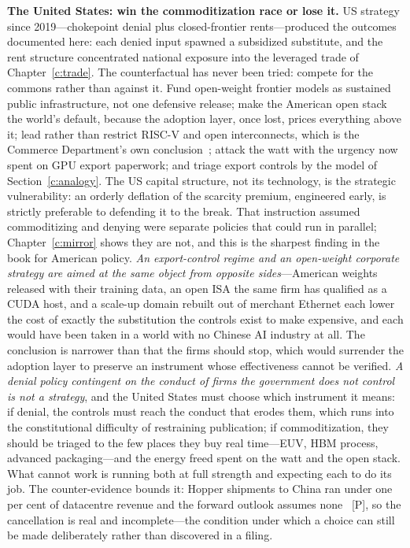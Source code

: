 \textbf{The United States: win the commoditization race or lose it.}  US strategy since 2019---chokepoint denial plus closed-frontier rents---produced the outcomes documented here: each denied input spawned a subsidized substitute, and the rent structure concentrated national exposure into the leveraged trade of Chapter~\ref{c:trade}. The counterfactual has never been tried: compete for the commons rather than against it. Fund open-weight frontier models as sustained public infrastructure, not one defensive release; make the American open stack the world's default, because the adoption layer, once lost, prices everything above it; lead rather than restrict RISC-V and open interconnects, which is the Commerce Department's own conclusion~\cite{riscv-restrict}; attack the watt with the urgency now spent on GPU export paperwork; and triage export controls by the model of Section~\ref{c:analogy}. The US capital structure, not its technology, is the strategic vulnerability: an orderly deflation of the scarcity premium, engineered early, is strictly preferable to defending it to the break. That instruction assumed commoditizing and denying were separate policies that could run in parallel; Chapter~\ref{c:mirror} shows they are not, and this is the sharpest finding in the book for American policy. \emph{An export-control regime and an open-weight corporate strategy are aimed at the same object from opposite sides}---American weights released with their training data, an open ISA the same firm has qualified as a CUDA host, and a scale-up domain rebuilt out of merchant Ethernet each lower the cost of exactly the substitution the controls exist to make expensive, and each would have been taken in a world with no Chinese AI industry at all. The conclusion is narrower than that the firms should stop, which would surrender the adoption layer to preserve an instrument whose effectiveness cannot be verified. \emph{A denial policy contingent on the conduct of firms the government does not control is not a strategy}, and the United States must choose which instrument it means: if denial, the controls must reach the conduct that erodes them, which runs into the constitutional difficulty of restraining publication; if commoditization, they should be triaged to the few places they buy real time---EUV, HBM process, advanced packaging---and the energy freed spent on the watt and the open stack. What cannot work is running both at full strength and expecting each to do its job. The counter-evidence bounds it: Hopper shipments to China ran under one per cent of datacentre revenue and the forward outlook assumes none~\cite{nvda-segments} [P], so the cancellation is real and incomplete---the condition under which a choice can still be made deliberately rather than discovered in a filing.

